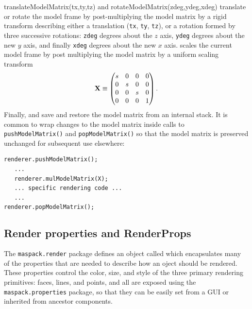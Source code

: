 %
%
{translateModelMatrix(tx,ty,tz)} and
%
{rotateModelMatrix(zdeg,ydeg,xdeg)} translate or rotate the model
frame by post-multiplying the model matrix by a rigid transform
describing either a translation ({\tt tx}, {\tt ty}, {\tt tz}), or
a rotation formed by three successive rotations: {\tt zdeg} degrees
about the $z$ axis, {\tt ydeg} degrees about the new $y$ axis, and
finally {\tt xdeg} degrees about the new $x$ axis.
scales the current model frame by
post multiplying the model matrix by a uniform scaling transform
%
\begin{equation*}
{\bf X} \equiv \left(\begin{matrix}
s & 0 & 0 & 0 \\
0 & s & 0 & 0 \\
0 & 0 & s & 0 \\
0 & 0 & 0 & 1 \\
\end{matrix}\right).
\end{equation*}
%
Finally,  and
 save and
restore the model matrix from an internal stack. It is common to
wrap changes to the model matrix inside calls to {\tt
pushModelMatrix()} and {\tt popModelMatrix()} so that the model matrix
is preserved unchanged for subsequent use elsewhere:
%
\begin{lstlisting}[]
renderer.pushModelMatrix();
   ...
   renderer.mulModelMatrix(X);
   ... specific rendering code ...
   ...
renderer.popModelMatrix();
\end{lstlisting}
%

\subsection{Render properties and RenderProps}
\label{RenderProps:sec}

The {\tt maspack.render} package defines an object called
 which encapsulates many of the
properties that are needed to describe how an oject should be
rendered. These properties control the color, size, and style of the
three primary rendering primitives: faces, lines, and points, and all
are exposed using the {\tt maspack.properties}
package, so that they can be easily set from a GUI or inherited from
ancestor components.

